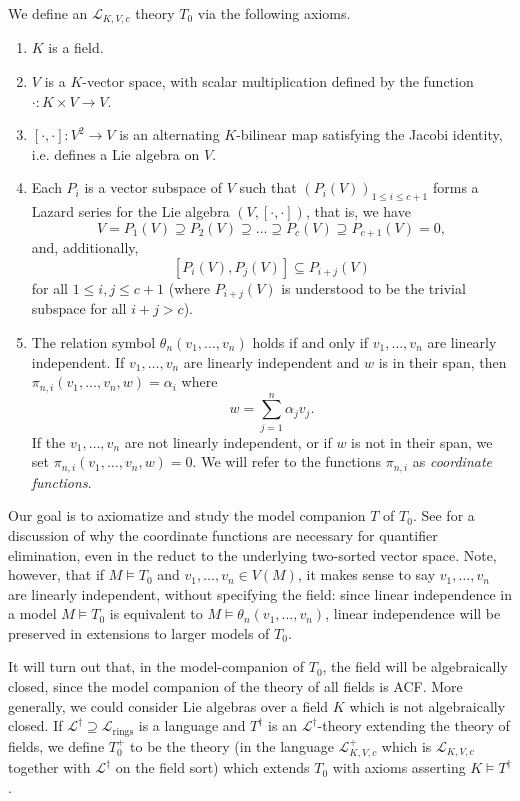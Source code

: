 \documentclass[psamsfonts]{amsart}
\theoremstyle{definition}
\theoremstyle{definition}
\theoremstyle{remark}
\numberwithin{equation}{section}
\newcommand\LL{\mathscr{L}}
\renewcommand{\models}{\vDash}
\begin{document}
We define an $\LL_{K,V,c}$ theory $T_{0}$ via the following axioms.
\begin{enumerate}
    \item $K$ is a field.
    \item $V$ is a $K$-vector space, with scalar multiplication defined by the function $\cdot : K \times V \to V$.  
    \item $[\cdot,\cdot]:V^{2} \to V$ is an alternating $K$-bilinear map satisfying the Jacobi identity, i.e. defines a Lie algebra on $V$.  
    \item Each $P_{i}$ is a vector subspace of $V$ such that $(P_{i}(V))_{1 \leq i \leq c+1}$ forms a Lazard series for the Lie algebra $(V,[\cdot,\cdot])$, that is, we have  
    $$
    V = P_{1}(V) \supseteq P_{2}(V) \supseteq \ldots \supseteq P_{c}(V) \supseteq P_{c+1}(V) = 0,
    $$
    and, additionally, 
    $$
    [P_{i}(V),P_{j}(V)] \subseteq P_{i+j}(V)
    $$
    for all $1 \leq i,j \leq c+1$ (where $P_{i+j}(V)$ is understood to be the trivial subspace for all $i+j > c$).  
    \item The relation symbol $\theta_{n}(v_{1}, \ldots, v_{n})$ holds if and only if $v_{1}, \ldots, v_{n}$ are linearly independent.  If $v_{1}, \ldots, v_{n}$ are linearly independent and $w$ is in their span, then $\pi_{n,i}(v_{1}, \ldots, v_{n},w) = \alpha_{i}$ where
    $$
    w = \sum_{j = 1}^{n} \alpha_{j}v_{j}. 
    $$
    If the $v_{1}, \ldots, v_{n}$ are not linearly independent, or if $w$ is not in their span, we set $\pi_{n,i}(v_{1}, \ldots, v_{n},w) = 0$. 
 We will refer to the functions $\pi_{n,i}$ as \emph{coordinate functions}. 
\end{enumerate}
Our goal is to axiomatize and study the model companion $T$ of $T_{0}$. See \cite[Section 2.2]{dobrowolskisets} for a discussion of why the coordinate functions are necessary for quantifier elimination, even in the reduct to the underlying two-sorted vector space.  Note, however, that if $M \models T_{0}$ and $v_{1}, \ldots, v_{n} \in V(M)$, it makes sense to say $v_{1}, \ldots, v_{n}$ are linearly independent, without specifying the field: since linear independence in a model $M \models T_{0}$ is equivalent to $M \models \theta_{n}(v_{1}, \ldots, v_{n})$, linear independence will be preserved in extensions to larger models of $T_{0}$. 

It will turn out that, in the model-companion of $T_0$, the field will be algebraically closed, since the model companion of the theory of all fields is ACF. More generally, we could consider Lie algebras over a field $K$ which is not algebraically closed.  If $\LL^{\dagger} \supseteq \LL_{\mathrm{rings}}$ is a language and $T^{\dagger}$ is an $\LL^{\dagger}$-theory extending the theory of fields, we define $T_{0}^{+}$ to be the theory (in the language $\LL_{K,V,c}^+$ which is $\LL_{K,V,c}$ together with $\LL^{\dagger}$ on the field sort) which extends $T_{0}$ with axioms asserting $K \models T^{\dagger}$. 
\end{document}
